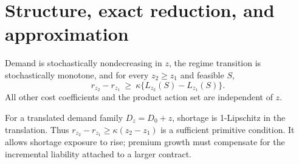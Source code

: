 \section{Structure, exact reduction, and approximation}\label{sec:structure}
\begin{assumption}\label{ass:lattice}
Demand is stochastically nondecreasing in $z$, the regime transition is stochastically monotone, and for every $z_2\geq z_1$ and feasible $S$,
\begin{equation}\label{eq:premium}
 r_{z_2}-r_{z_1}\ \geq\ \kappa\{L_{z_2}(S)-L_{z_1}(S)\}.
\end{equation}
All other cost coefficients and the product action set are independent of $z$.
\end{assumption}
For a translated demand family $D_z=D_0+z$, shortage is 1-Lipschitz in the translation. Thus $r_{z_2}-r_{z_1}\geq\kappa(z_2-z_1)$ is a sufficient primitive condition. It allows shortage exposure to rise; premium growth must compensate for the incremental liability attached to a larger contract.

